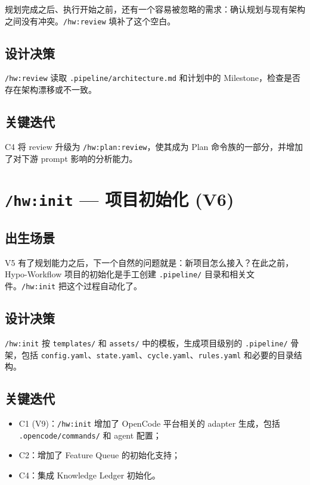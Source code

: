 \documentclass[
  outputdir=build,
  chapterstyle=cn,
  colorscheme=Simple,
  fontset=tech,
  code=false
]{Hypo-Note}
\begin{document}
规划完成之后、执行开始之前，还有一个容易被忽略的需求：确认规划与现有架构之间没有冲突。\texttt{/hw:review} 填补了这个空白。

\subsection{设计决策}

\texttt{/hw:review} 读取 \texttt{.pipeline/architecture.md} 和计划中的 Milestone，检查是否存在架构漂移或不一致。

\subsection{关键迭代}

C4 将 review 升级为 \texttt{/hw:plan:review}，使其成为 Plan 命令族的一部分，并增加了对下游 prompt 影响的分析能力。

\section{\texttt{/hw:init} — 项目初始化 (V6)}

\subsection{出生场景}

V5 有了规划能力之后，下一个自然的问题就是：新项目怎么接入？在此之前，Hypo-Workflow 项目的初始化是手工创建 \texttt{.pipeline/} 目录和相关文件。\texttt{/hw:init} 把这个过程自动化了。

\subsection{设计决策}

\texttt{/hw:init} 按 \texttt{templates/} 和 \texttt{assets/} 中的模板，生成项目级别的 \texttt{.pipeline/} 骨架，包括 \texttt{config.yaml}、\texttt{state.yaml}、\texttt{cycle.yaml}、\texttt{rules.yaml} 和必要的目录结构。

\subsection{关键迭代}

\begin{itemize}[leftmargin=2em]
  \item C1 (V9)：\texttt{/hw:init} 增加了 OpenCode 平台相关的 adapter 生成，包括 \texttt{.opencode/commands/} 和 agent 配置；
  \item C2：增加了 Feature Queue 的初始化支持；
  \item C4：集成 Knowledge Ledger 初始化。
\end{itemize}
\end{document}
